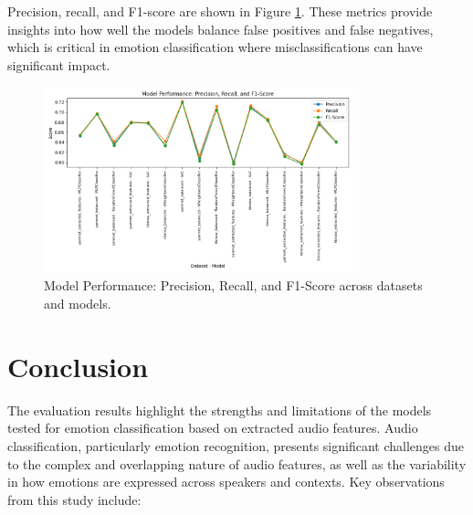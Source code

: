 \documentclass{article}
\begin{document}
Precision, recall, and F1-score are shown in Figure \ref{fig:other_metrics_plot}. These metrics provide insights into 
how well the models balance false positives and false negatives, which is critical in emotion classification where 
misclassifications can have significant impact.

\begin{figure}[!h]
    \centering
    \includegraphics[width=0.8\textwidth]{../assets/model_performance_other_metrics.png}
    \caption{Model Performance: Precision, Recall, and F1-Score across datasets and models.}
    \label{fig:other_metrics_plot}
\end{figure}


\section*{Conclusion}

The evaluation results highlight the strengths and limitations of the models tested for emotion classification 
based on extracted audio features. Audio classification, particularly emotion recognition, presents significant 
challenges due to the complex and overlapping nature of audio features, as well as the variability in how emotions 
are expressed across speakers and contexts. Key observations from this study include:
\end{document}
